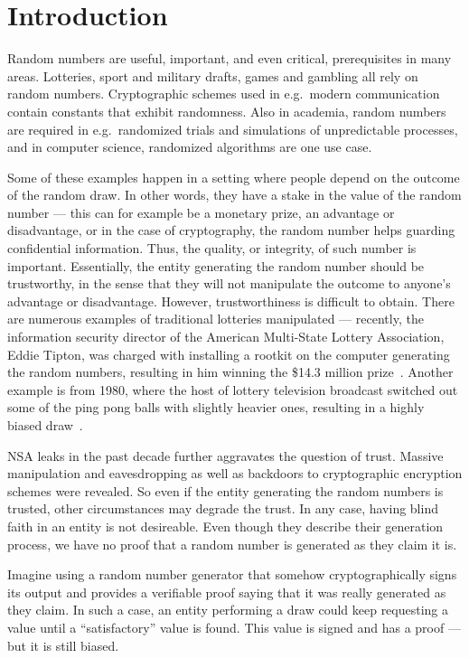 \section{Introduction}\label{cha:introduction}

Random numbers are useful, important, and even critical, prerequisites in many areas. Lotteries, sport and military drafts, games and gambling all rely on random numbers. Cryptographic schemes used in e.g.\ modern communication contain constants that exhibit randomness. Also in academia, random numbers are required in e.g.\ randomized trials and simulations of unpredictable processes, and in computer science, randomized algorithms are one use case.

Some of these examples happen in a setting where people depend on the outcome of the random draw. In other words, they have a stake in the value of the random number --- this can for example be a monetary prize, an advantage or disadvantage, or in the case of cryptography, the random number helps guarding confidential information. Thus, the quality, or integrity, of such number is important. Essentially, the entity generating the random number should be trustworthy, in the sense that they will not manipulate the outcome to anyone's advantage or disadvantage. However, trustworthiness is difficult to obtain. There are numerous examples of traditional lotteries manipulated --- recently, the information security director of the American Multi-State Lottery Association, Eddie Tipton, was charged with installing a rootkit on the computer generating the random numbers, resulting in him winning the \$14.3 million prize~\cite{bbclotteryexploit}. Another example is from 1980, where the host of lottery television broadcast switched out some of the ping pong balls with slightly heavier ones, resulting in a highly biased draw~\cite{lotteryscandal-666}.

NSA leaks in the past decade further aggravates the question of trust. Massive manipulation and eavesdropping as well as backdoors to cryptographic encryption schemes were revealed. So even if the entity generating the random numbers is trusted, other circumstances may degrade the trust. In any case, having blind faith in an entity is not desireable. Even though they describe their generation process, we have no proof that a random number is generated as they claim it is.

Imagine using a random number generator that somehow cryptographically signs its output and provides a verifiable proof saying that it was really generated  as they claim. In such a case, an entity performing a draw could keep requesting a value until a \enquote{satisfactory} value is found. This value is signed and has a proof --- but it is still biased.

